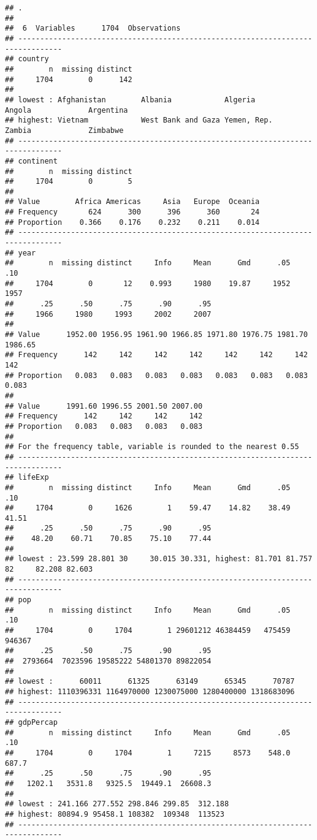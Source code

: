 \documentclass[
]{book}
\begin{document}
\begin{verbatim}
## . 
## 
##  6  Variables      1704  Observations
## --------------------------------------------------------------------------------
## country 
##        n  missing distinct 
##     1704        0      142 
## 
## lowest : Afghanistan        Albania            Algeria            Angola             Argentina         
## highest: Vietnam            West Bank and Gaza Yemen, Rep.        Zambia             Zimbabwe          
## --------------------------------------------------------------------------------
## continent 
##        n  missing distinct 
##     1704        0        5 
##                                                        
## Value        Africa Americas     Asia   Europe  Oceania
## Frequency       624      300      396      360       24
## Proportion    0.366    0.176    0.232    0.211    0.014
## --------------------------------------------------------------------------------
## year 
##        n  missing distinct     Info     Mean      Gmd      .05      .10 
##     1704        0       12    0.993     1980    19.87     1952     1957 
##      .25      .50      .75      .90      .95 
##     1966     1980     1993     2002     2007 
##                                                                           
## Value      1952.00 1956.95 1961.90 1966.85 1971.80 1976.75 1981.70 1986.65
## Frequency      142     142     142     142     142     142     142     142
## Proportion   0.083   0.083   0.083   0.083   0.083   0.083   0.083   0.083
##                                           
## Value      1991.60 1996.55 2001.50 2007.00
## Frequency      142     142     142     142
## Proportion   0.083   0.083   0.083   0.083
## 
## For the frequency table, variable is rounded to the nearest 0.55
## --------------------------------------------------------------------------------
## lifeExp 
##        n  missing distinct     Info     Mean      Gmd      .05      .10 
##     1704        0     1626        1    59.47    14.82    38.49    41.51 
##      .25      .50      .75      .90      .95 
##    48.20    60.71    70.85    75.10    77.44 
## 
## lowest : 23.599 28.801 30     30.015 30.331, highest: 81.701 81.757 82     82.208 82.603
## --------------------------------------------------------------------------------
## pop 
##        n  missing distinct     Info     Mean      Gmd      .05      .10 
##     1704        0     1704        1 29601212 46384459   475459   946367 
##      .25      .50      .75      .90      .95 
##  2793664  7023596 19585222 54801370 89822054 
## 
## lowest :      60011      61325      63149      65345      70787
## highest: 1110396331 1164970000 1230075000 1280400000 1318683096
## --------------------------------------------------------------------------------
## gdpPercap 
##        n  missing distinct     Info     Mean      Gmd      .05      .10 
##     1704        0     1704        1     7215     8573    548.0    687.7 
##      .25      .50      .75      .90      .95 
##   1202.1   3531.8   9325.5  19449.1  26608.3 
## 
## lowest : 241.166 277.552 298.846 299.85  312.188
## highest: 80894.9 95458.1 108382  109348  113523 
## --------------------------------------------------------------------------------
\end{verbatim}
\end{document}
